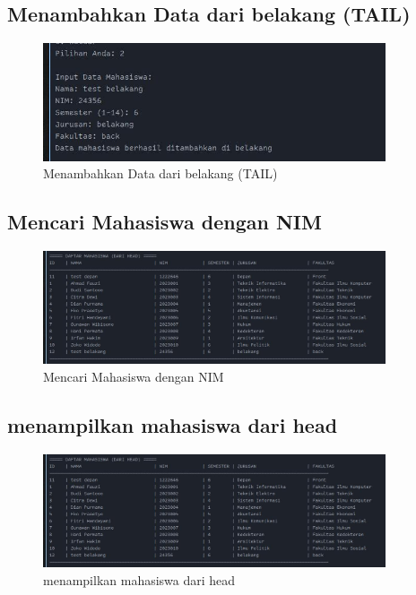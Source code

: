 \documentclass{article}
\begin{document}
\subsection{Menambahkan Data dari belakang (TAIL)}

\begin{figure}[H]
\centering
\includegraphics[width=0.9\textwidth]{images/gambar3.jpg}
\caption{Menambahkan Data dari belakang (TAIL)}
\label{fig:sample-image}
\end{figure}

\subsection{Mencari Mahasiswa dengan NIM}

\begin{figure}[H]
\centering
\includegraphics[width=0.9\textwidth]{images/gambar5.jpg}
\caption{Mencari Mahasiswa dengan NIM}
\label{fig:sample-image}
\end{figure}

\subsection{menampilkan mahasiswa dari head}

\begin{figure}[H]
\centering
\includegraphics[width=0.9\textwidth]{images/gambar5.jpg}
\caption{menampilkan mahasiswa dari head}
\label{fig:sample-image}
\end{figure}
\end{document}
